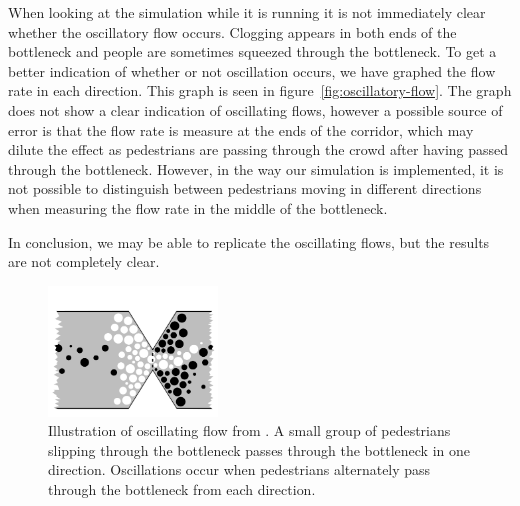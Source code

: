 When looking at the simulation while it is running it is not immediately clear 
whether the oscillatory flow occurs. Clogging appears in both ends of the 
bottleneck and people are sometimes squeezed through the bottleneck. To get a 
better indication of whether or not oscillation occurs, we have graphed the 
flow rate in each direction. This graph is seen in 
figure~\ref{fig:oscillatory-flow}. The graph does not show a clear indication 
of oscillating flows, however a possible source of error is that the flow rate 
is measure at the ends of the corridor, which may dilute the effect as 
pedestrians are passing through the crowd after having passed through the 
bottleneck. However, in the way our simulation is implemented, it is not 
possible to distinguish between pedestrians moving in different directions 
when measuring the flow rate in the middle of the bottleneck.

In conclusion, we may be able to replicate the oscillating flows, but the 
results are not completely clear.
\begin{figure}[h]
    \centering
    \includegraphics[width=0.4\textwidth]{Figures/oscil_flow.png}
    \caption[Illustration of oscillating flow from \cite{oscil}]{Illustration 
    of oscillating flow from \cite{oscil}. A small group of pedestrians 
    slipping through the bottleneck passes through the bottleneck in one 
    direction. Oscillations occur when pedestrians alternately pass through 
    the bottleneck from each direction.}
    \label{fig:oscillitoryflow_litterature}
\end{figure}

